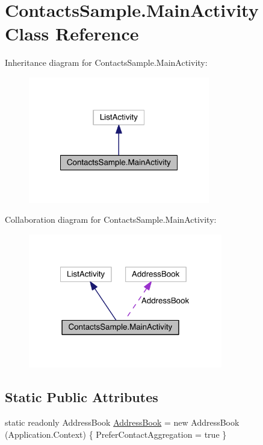 \hypertarget{class_contacts_sample_1_1_main_activity}{\section{Contacts\+Sample.\+Main\+Activity Class Reference}
\label{class_contacts_sample_1_1_main_activity}
}


Inheritance diagram for Contacts\+Sample.\+Main\+Activity\+:
\nopagebreak
\begin{figure}[H]
\begin{center}
\leavevmode
\includegraphics[width=224pt]{class_contacts_sample_1_1_main_activity__inherit__graph}
\end{center}
\end{figure}


Collaboration diagram for Contacts\+Sample.\+Main\+Activity\+:
\nopagebreak
\begin{figure}[H]
\begin{center}
\leavevmode
\includegraphics[width=240pt]{class_contacts_sample_1_1_main_activity__coll__graph}
\end{center}
\end{figure}
\subsection*{Static Public Attributes}
\begin{DoxyCompactItemize}
\item 
static readonly Address\+Book \hyperlink{class_contacts_sample_1_1_main_activity_afe1039b93c41b2ea89bb75f3fa0579ad}{Address\+Book} = new Address\+Book (Application.\+Context) \{ Prefer\+Contact\+Aggregation = true \}
\end{DoxyCompactItemize}
